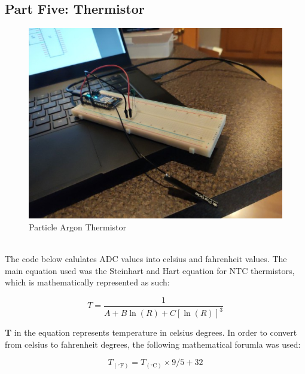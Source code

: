 \documentclass{article}
\begin{document}
\subsection{Part Five: Thermistor}
\begin{figure}[H]
\center
\includegraphics[width=\textwidth]{images/temperature.jpeg}
\caption{Particle Argon Thermistor}
\label{fig:temperature}
\end{figure}\ \\

The code below calulates ADC values into celsius and fahrenheit values. The main equation used was the Steinhart and Hart equation for NTC thermistors, which is mathematically represented as such:

\[T=\frac{1}{A+B \ln (R)+C[\ln (R)]^{3}}\]

\textbf{T} in the equation represents temperature in celsius degrees. In order to convert from celsius to fahrenheit degrees, the following mathematical forumla was used:

\[T_{\left(^{\circ} \mathrm{F}\right)}=T_{\left(^{\circ} \mathrm{C}\right)} \times 9 / 5+32\]

\begin{minipage}[c]{\textwidth}

\end{minipage}\ \\
\end{document}

